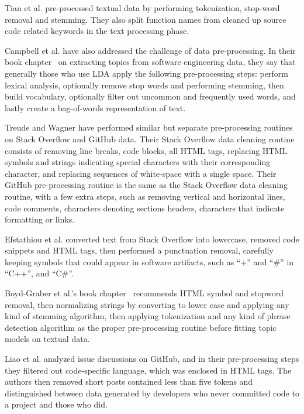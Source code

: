         Tian et al. \cite{tian2013predicting} pre-processed textual data by performing tokenization, stop-word removal and stemming. They also split function names from cleaned up source code related keywords in the text processing phase.
        
        Campbell et al. have also addressed the challenge of data pre-processing. In their
        book chapter~\cite{campbell2015latent} on extracting topics from software engineering data, they say that generally those who use LDA apply the following pre-processing steps: perform lexical analysis, optionally remove stop words and performing stemming, then build vocabulary, optionally filter out uncommon and frequently used words, and lastly create a bag-of-words representation of text.
        
        Treude and Wagner \cite{treude2019predicting} have performed similar but separate pre-processing routines on Stack Overflow and GitHub data. Their Stack Overflow data cleaning routine consists of removing line breaks, code blocks, all HTML tags, replacing HTML symbols and strings indicating special characters with their corresponding character, and replacing sequences of white-space with a single space. Their GitHub pre-processing routine is the same as the Stack Overflow data cleaning routine, with a few extra steps, such as removing vertical and horizontal lines, code comments, characters denoting sections headers, characters that indicate formatting or links. 
        
        Efstathiou et al. \cite{efstathiou2018word} converted text from Stack Overflow into lowercase, removed code snippets and HTML tags, then performed a punctuation removal, carefully keeping symbols that could appear in software artifacts, such as ``+'' and ``\#'' in ``C++'', and ``C\#''. 
        
        Boyd-Graber et al.'s book chapter~\cite{boyd2014care} recommends HTML symbol and stopword removal, then normalizing strings by converting to lower case and applying any kind of stemming algorithm, then applying tokenization and any kind of phrase detection algorithm as the proper pre-processing routine before fitting topic models on textual data.
        
        Liao et al. \cite{liao2019status} analyzed issue discussions on GitHub, and in their pre-processing steps they filtered out code-specific language, which was enclosed in HTML tags. The authors then removed short posts contained less than five tokens and distinguished between data generated by developers who never committed code to a project and those who did.
    
